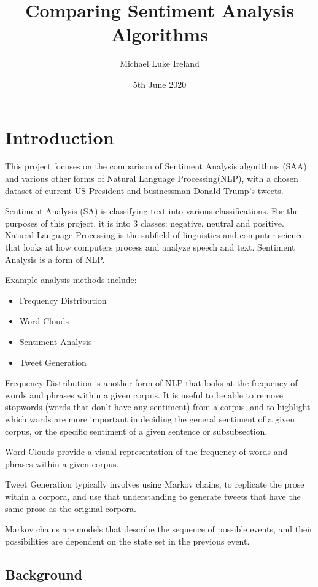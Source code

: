 \documentclass{article}
\title{Comparing Sentiment Analysis Algorithms}
\date{5th June 2020}
\author{Michael Luke Ireland}
\begin{document}
\maketitle
\newpage
\tableofcontents
\newpage
{}

\section{Introduction}
This project focuses on the comparison of Sentiment Analysis algorithms (SAA) and various other forms of Natural Language Processing(NLP), with a chosen dataset of current US President and businessman Donald Trump's tweets.

Sentiment Analysis (SA) is classifying text into various classifications.
For the purposes of this project, it is into 3 classes: negative, neutral and positive.
Natural Language Processing is the subfield of linguistics and computer science that looks at how computers process and analyze speech and text.
Sentiment Analysis is a form of NLP.

Example analysis methods include:
\begin{itemize}
	\item Frequency Distribution
	\item Word Clouds
	\item Sentiment Analysis
	\item Tweet Generation
\end{itemize}

Frequency Distribution is another form of NLP that looks at the frequency of words and phrases within a given corpus.
It is useful to be able to remove stopwords (words that don't have any sentiment) from a corpus, and to highlight which words are more important in deciding the general sentiment of a given corpus, or the specific sentiment of a given sentence or subsubsection.

Word Clouds provide a visual representation of the frequency of words and phrases within a given corpus.

Tweet Generation typically involves using Markov chains, to replicate the prose within a corpora, and use that understanding to generate tweets that have the same prose as the original corpora.

Markov chains are models that describe the sequence of possible events, and their possibilities are dependent on the state set in the previous event.

\subsection{Background}
\end{document}
